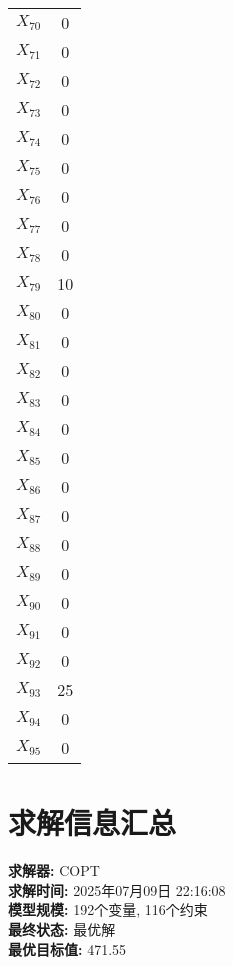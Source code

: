 \documentclass[a4paper,10pt]{article}
\begin{document}
\begin{center}
\begin{longtable}{cc}
$X_{70}$ & 0 \\
$X_{71}$ & 0 \\
$X_{72}$ & 0 \\
$X_{73}$ & 0 \\
$X_{74}$ & 0 \\
$X_{75}$ & 0 \\
$X_{76}$ & 0 \\
$X_{77}$ & 0 \\
$X_{78}$ & 0 \\
$X_{79}$ & 10 \\
$X_{80}$ & 0 \\
$X_{81}$ & 0 \\
$X_{82}$ & 0 \\
$X_{83}$ & 0 \\
$X_{84}$ & 0 \\
$X_{85}$ & 0 \\
$X_{86}$ & 0 \\
$X_{87}$ & 0 \\
$X_{88}$ & 0 \\
$X_{89}$ & 0 \\
$X_{90}$ & 0 \\
$X_{91}$ & 0 \\
$X_{92}$ & 0 \\
$X_{93}$ & 25 \\
$X_{94}$ & 0 \\
$X_{95}$ & 0 \\
\end{longtable}
\end{center}

\section{求解信息汇总}

\textbf{求解器:} COPT \\
\textbf{求解时间:} 2025年07月09日 22:16:08 \\
\textbf{模型规模:} 192个变量, 116个约束 \\
\textbf{最终状态:} 最优解 \\
\textbf{最优目标值:} 471.55
\end{document}
